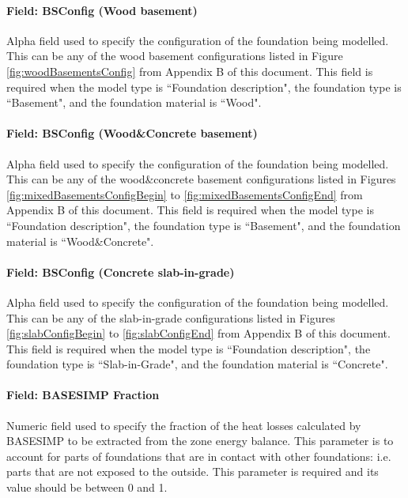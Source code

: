 \paragraph{Field: BSConfig (Wood basement)}\label{field-configwoodbasement-basesimp}

Alpha field used to specify the configuration of the foundation being modelled.  This can be any of the wood basement configurations listed in Figure \ref{fig:woodBasementsConfig} from Appendix B of this document.  This field is required when the model type is ``Foundation description", the foundation type is ``Basement", and the foundation material is ``Wood".

\paragraph{Field: BSConfig (Wood\&Concrete basement)}\label{field-configmixtbasement-basesimp}

Alpha field used to specify the configuration of the foundation being modelled.  This can be any of the wood\&concrete basement configurations listed in Figures \ref{fig:mixedBasementsConfigBegin} to \ref{fig:mixedBasementsConfigEnd} from Appendix B of this document.  This field is required when the model type is ``Foundation description", the foundation type is ``Basement", and the foundation material is ``Wood\&Concrete".

\paragraph{Field: BSConfig (Concrete slab-in-grade)}\label{field-configconcslab-basesimp}

Alpha field used to specify the configuration of the foundation being modelled.  This can be any of the slab-in-grade configurations listed in Figures \ref{fig:slabConfigBegin} to \ref{fig:slabConfigEnd} from Appendix B of this document.  This field is required when the model type is ``Foundation description", the foundation type is ``Slab-in-Grade", and the foundation material is ``Concrete".

\paragraph{Field: BASESIMP Fraction}\label{field-basesimpfraction-basesimp}

Numeric field used to specify the fraction of the heat losses calculated by BASESIMP to be extracted from the zone energy balance.  This parameter is to account for parts of foundations that are in contact with other foundations: i.e. parts that are not exposed to the outside.  This parameter is required and its value should be between 0 and 1.

